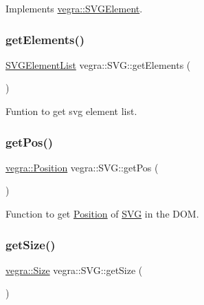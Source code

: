 Implements \mbox{\hyperlink{structvegra_1_1SVGElement_a17fa30b9de97e1541eaa1f6888145de2}{vegra\+::\+S\+V\+G\+Element}}.

\mbox{\label{structvegra_1_1SVG_a6096892ee39e3680fddd6657a98b7a75}} 
\subsubsection{\texorpdfstring{get\+Elements()}{getElements()}}
{\footnotesize\ttfamily \mbox{\hyperlink{namespacevegra_a2722f5eceb74f65746a02a57b71d125e}{S\+V\+G\+Element\+List}} vegra\+::\+S\+V\+G\+::get\+Elements (\begin{DoxyParamCaption}{ }\end{DoxyParamCaption})\hspace{0.3cm}{\ttfamily [inline]}}



Funtion to get svg element list. 

\mbox{\label{structvegra_1_1SVG_a6d7a82c399cdf3ea7e078b66a8bbf024}} 
\subsubsection{\texorpdfstring{get\+Pos()}{getPos()}}
{\footnotesize\ttfamily \mbox{\hyperlink{structvegra_1_1Position}{vegra\+::\+Position}} vegra\+::\+S\+V\+G\+::get\+Pos (\begin{DoxyParamCaption}{ }\end{DoxyParamCaption})\hspace{0.3cm}{\ttfamily [inline]}}



Function to get \mbox{\hyperlink{structvegra_1_1Position}{Position}} of \mbox{\hyperlink{structvegra_1_1SVG}{S\+VG}} in the D\+OM. 

\mbox{\label{structvegra_1_1SVG_ad1b80e84f2eeccbbf7c039812f6c35fa}} 
\subsubsection{\texorpdfstring{get\+Size()}{getSize()}}
{\footnotesize\ttfamily \mbox{\hyperlink{structvegra_1_1Size}{vegra\+::\+Size}} vegra\+::\+S\+V\+G\+::get\+Size (\begin{DoxyParamCaption}{ }\end{DoxyParamCaption})\hspace{0.3cm}{\ttfamily [inline]}}



